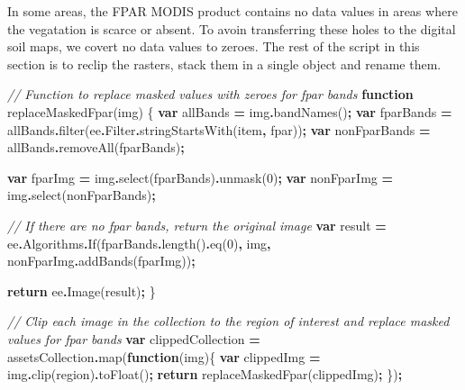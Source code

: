 \documentclass[
  10pt,
  b5paper,
  oneside]{book}
\newenvironment{Shaded}{\begin{snugshade}}{\end{snugshade}}
\newcommand{\AttributeTok}[1]{\textcolor[rgb]{0.77,0.63,0.00}{#1}}
\newcommand{\CommentTok}[1]{\textcolor[rgb]{0.56,0.35,0.01}{\textit{#1}}}
\newcommand{\ControlFlowTok}[1]{\textcolor[rgb]{0.13,0.29,0.53}{\textbf{#1}}}
\newcommand{\DecValTok}[1]{\textcolor[rgb]{0.00,0.00,0.81}{#1}}
\newcommand{\FunctionTok}[1]{\textcolor[rgb]{0.00,0.00,0.00}{#1}}
\newcommand{\KeywordTok}[1]{\textcolor[rgb]{0.13,0.29,0.53}{\textbf{#1}}}
\newcommand{\NormalTok}[1]{#1}
\newcommand{\OperatorTok}[1]{\textcolor[rgb]{0.81,0.36,0.00}{\textbf{#1}}}
\newcommand{\StringTok}[1]{\textcolor[rgb]{0.31,0.60,0.02}{#1}}
\begin{document}
In some areas, the FPAR MODIS product contains no data values in areas where the vegatation is scarce or absent. To avoin transferring these holes to the digital soil maps, we covert no data values to zeroes.
The rest of the script in this section is to reclip the rasters, stack them in a single object and rename them.

\begin{Shaded}
\begin{Highlighting}[]
\CommentTok{// Function to replace masked values with zeroes for fpar bands}
\KeywordTok{function} \FunctionTok{replaceMaskedFpar}\NormalTok{(img) \{}
  \KeywordTok{var}\NormalTok{ allBands }\OperatorTok{=}\NormalTok{ img}\OperatorTok{.}\FunctionTok{bandNames}\NormalTok{()}\OperatorTok{;}
  \KeywordTok{var}\NormalTok{ fparBands }\OperatorTok{=}\NormalTok{ allBands}\OperatorTok{.}\FunctionTok{filter}\NormalTok{(ee}\OperatorTok{.}\AttributeTok{Filter}\OperatorTok{.}\FunctionTok{stringStartsWith}\NormalTok{(}\StringTok{\textquotesingle{}item\textquotesingle{}}\OperatorTok{,} \StringTok{\textquotesingle{}fpar\textquotesingle{}}\NormalTok{))}\OperatorTok{;}
  \KeywordTok{var}\NormalTok{ nonFparBands }\OperatorTok{=}\NormalTok{ allBands}\OperatorTok{.}\FunctionTok{removeAll}\NormalTok{(fparBands)}\OperatorTok{;}
  
  \KeywordTok{var}\NormalTok{ fparImg }\OperatorTok{=}\NormalTok{ img}\OperatorTok{.}\FunctionTok{select}\NormalTok{(fparBands)}\OperatorTok{.}\FunctionTok{unmask}\NormalTok{(}\DecValTok{0}\NormalTok{)}\OperatorTok{;}
  \KeywordTok{var}\NormalTok{ nonFparImg }\OperatorTok{=}\NormalTok{ img}\OperatorTok{.}\FunctionTok{select}\NormalTok{(nonFparBands)}\OperatorTok{;}
  
  \CommentTok{// If there are no fpar bands, return the original image}
  \KeywordTok{var}\NormalTok{ result }\OperatorTok{=}\NormalTok{ ee}\OperatorTok{.}\AttributeTok{Algorithms}\OperatorTok{.}\FunctionTok{If}\NormalTok{(fparBands}\OperatorTok{.}\FunctionTok{length}\NormalTok{()}\OperatorTok{.}\FunctionTok{eq}\NormalTok{(}\DecValTok{0}\NormalTok{)}\OperatorTok{,}
\NormalTok{                                 img}\OperatorTok{,}
\NormalTok{                                 nonFparImg}\OperatorTok{.}\FunctionTok{addBands}\NormalTok{(fparImg))}\OperatorTok{;}
  
  \ControlFlowTok{return}\NormalTok{ ee}\OperatorTok{.}\FunctionTok{Image}\NormalTok{(result)}\OperatorTok{;}
\NormalTok{\}}

\CommentTok{// Clip each image in the collection to the region of interest and replace masked values for fpar bands}
\KeywordTok{var}\NormalTok{ clippedCollection }\OperatorTok{=}\NormalTok{ assetsCollection}\OperatorTok{.}\FunctionTok{map}\NormalTok{(}\KeywordTok{function}\NormalTok{(img)\{}
  \KeywordTok{var}\NormalTok{ clippedImg }\OperatorTok{=}\NormalTok{ img}\OperatorTok{.}\FunctionTok{clip}\NormalTok{(region)}\OperatorTok{.}\FunctionTok{toFloat}\NormalTok{()}\OperatorTok{;}
  \ControlFlowTok{return} \FunctionTok{replaceMaskedFpar}\NormalTok{(clippedImg)}\OperatorTok{;}
\NormalTok{\})}\OperatorTok{;}


\end{Highlighting}
\end{Shaded}
\end{document}
